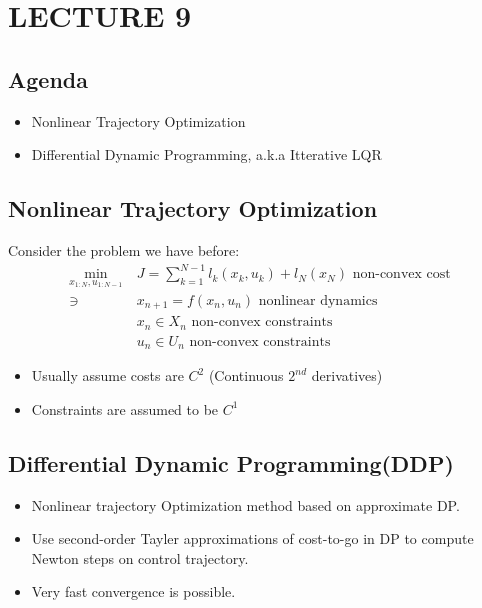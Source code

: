 \newpage
\section{LECTURE 9}

\subsection{Agenda}
\begin{itemize}
    \item Nonlinear Trajectory Optimization
    \item Differential Dynamic Programming, a.k.a Itterative LQR
\end{itemize}

\subsection{Nonlinear Trajectory Optimization}
Consider the problem we have before: 
\begin{align}
    \min_{x_{1:N}, u_{1:N-1}} \ & J = \sum_{k=1}^{N-1} l_k(x_k, u_k) + l_N(x_N) \text{ non-convex cost}\\
    \ni \ & x_{n+1} = f(x_n,u_n) \text{ nonlinear dynamics} \\
    & x_n \in X_n \text{ non-convex constraints} \\
    & u_n \in U_n \text{ non-convex constraints}
\end{align}

\begin{itemize}
    \item Usually assume costs are $C^2$ (Continuous $2^{nd}$ derivatives)
    \item Constraints are assumed to be $C^1$
\end{itemize}

\subsection{Differential Dynamic Programming(DDP)}
\begin{itemize}
    \item Nonlinear trajectory Optimization method based on approximate DP.
    \item Use second-order Tayler approximations of cost-to-go in DP to compute Newton steps on control trajectory.
    \item Very fast convergence is possible.
\end{itemize}


